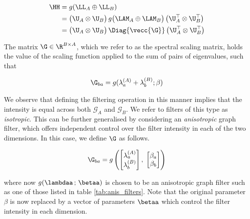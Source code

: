 \begin{align} 
    \label{eq:graph_filter}
    \HH &= g(\LL_A \oplus \LL_B) \notag \\ 
       &= \big( \U_A \otimes \U_B \big) \, g \big( \LAM_A \oplus \LAM_B \big) \, \big( \U_A^\top \otimes \U_B^\top \big) \notag \\
       &= \big( \U_A \otimes \U_B \big) \, \Diag{\vecc{\G}} \, \big( \U_A^\top \otimes \U_B^\top \big)
\end{align}

The matrix $\G \in \R^{B \times A}$, which we refer to as the spectral scaling matrix, holds the value of the scaling function applied to the sum of
pairs of eigenvalues, such that

\begin{equation}
    \G_{ba} = g(\lambda^{(A)}_a + \lambda^{(B)}_b; \beta)
\end{equation}

We observe that defining the filtering operation in this manner implies that the intensity is equal across both $\mathcal{G}_A$ and $\mathcal{G}_B$. We refer to filters of this type as \textit{isotropic}. This can be further generalised by considering an \textit{anisotropic} graph filter, which offers independent control over the filter intensity in each of the two dimensions. In this case, we define $\G$ as follows. 

\begin{equation}
    \G_{ba} =  g \left( \begin{bmatrix}
        \lambda^{(A)}_a \\ \lambda^{(B)}_b 
    \end{bmatrix}, \; \begin{bmatrix}
        \beta_a \\ \beta_b 
    \end{bmatrix} \right)
\end{equation}

where now $g(\lambdaa \,; \, \betaa)$ is chosen to be an anisotropic graph filter such as one of those listed in table \ref{tab:anis_filters}. Note that the original parameter $\beta$ is now replaced by a vector of parameters $\betaa$ which control the filter intensity in each dimension. 

